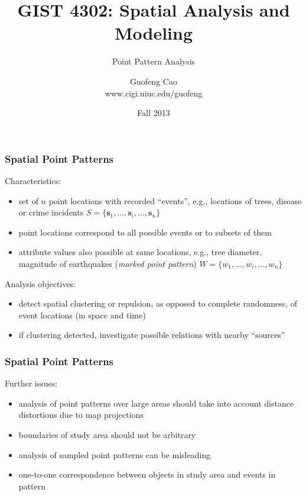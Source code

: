 \documentclass[10pt]{beamer}\usepackage[]{graphicx}\usepackage[]{color}
\title[GIST4302]{{\Large GIST 4302: Spatial Analysis and Modeling }}
\subtitle[Point Pattern Analysis]{\small Point Pattern Analysis}
\author[Guofeng Cao]{Guofeng Cao\\ [1.0ex]
\scriptsize{www.cigi.uiuc.edu/guofeng}}
\institute[Texas Tech]{
\texttt{[image: TTU-seal-color.pdf]}\\[1.0ex]
  Department of Geosciences\\ [0.5ex]
  Texas Tech University\\[1.5ex]
 \texttt{guofeng.cao@ttu.edu} \\[2ex]
}
\date[TTU]{Fall 2013}
\newcommand{\vecss}{\boldsymbol{s}}
\newcommand{\bblock}{\begin{block}}
\newcommand{\eblock}{\end{block}}
\begin{document}
\begin{frame}[plain]
  \titlepage
\end{frame}
\begin{frame}
\frametitle{Spatial Point Patterns}
\bblock{Characteristics:}
\begin{itemize}
	\item set of $n$ point locations with recorded ``events'', e.g., locations of trees, disease or crime incidents
		$S=\{\vecss_1,\ldots,\vecss_i,\ldots, \vecss_n\}$
	\item point locations correspond to all possible events or to subsets of them
\item attribute values also possible at same locations, e.g., tree diameter, magnitude of earthquakes ({\it marked point pattern}) $W=\{w_1,\ldots,w_i,\ldots, w_n\}$
\end{itemize}
\eblock
\bblock{Analysis objectives:}
\begin{itemize}
\item detect spatial clustering or repulsion, as opposed to complete randomness, of event locations (in space and time)
\item if clustering detected, investigate possible relations with nearby ``sources''
\end{itemize}
\eblock
\end{frame}

\begin{frame}
\frametitle{Spatial Point Patterns}
\bblock{Further issues:}
\begin{itemize}
\item analysis of point patterns over large areas should take into account distance distortions due to map projections
\item boundaries of study area should not be arbitrary
\item analysis of sampled point patterns can be misleading
\item one-to-one correspondence between objects in study area and events in pattern 
\end{itemize}
\eblock

\end{frame}
\end{document}
